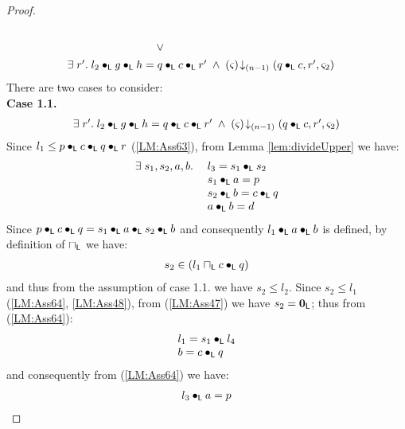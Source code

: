 \begin{lemma}[]
\begin{proof}
\begin{align}
\begin{array}{l l}
	\end{array}\label{LM:Ass62}\\
	& \hspace*{3cm}\lor\; \nonumber\\
	&\begin{array}{l l}
		\exsts{r'} l_2 \composeL g \composeL h = q \composeL c \composeL r' \;\land\; \extendsAMUpto{\amod{}}{(n-1)}{q\composeL c}{r'}{\amod{2}}
	\end{array}  \label{LM:Ass63}
\end{align}
%
There are two cases to consider:\\
\textbf{Case 1.1.} 
\[
\begin{array}{l}
		\exists\; r'.\; l_2 \bullet_{\textsf{L}} g \bullet_{\textsf{L}} h = q \bullet_{\textsf{L}} c \bullet_{\textsf{L}} r' \;\land\; \left(\varsigma_{}\right) \!\downarrow_{(n-1)} \left(q\bullet_{\textsf{L}} c, r', \varsigma_{2}\right)
\end{array}
\]
%
Since $l_1 \leq p \bullet_{\textsf{L}} c \bullet_{\textsf{L}} q \bullet_{\textsf{L}} r$ (\ref{LM:Ass63}), from Lemma \ref{lem:divideUpper} we have:
%
\begin{align}
	\begin{array}{l l}
	\exists\; s_1, s_2, a, b.\;& l_3 = s_1 \bullet_{\textsf{L}} s_2 \\
	& s_1 \bullet_{\textsf{L}} a =  p\\
	& s_2 \bullet_{\textsf{L}} b = c \bullet_{\textsf{L}} q\\
	&a \bullet_{\textsf{L}}  b = d 
	\end{array} \label{LM:Ass64}
\end{align}
%
Since $p \bullet_{\textsf{L}} c \bullet_{\textsf{L}} q  = s_1 \bullet_{\textsf{L}} a \bullet_{\textsf{L}} s_2 \bullet_{\textsf{L}} b $ and consequently $l_1 \bullet_{\textsf{L}} a \bullet_{\textsf{L}} b$ is defined, by definition of $\sqcap_{\textsf{L}}$ we have:
%
\begin{align}
	s_2 \in (l_1 \sqcap_{\textsf{L}} c \bullet_{\textsf{L}} q) \nonumber
\end{align} 
%
and thus from the assumption of case 1.1. we have $s_2 \leq l_2$. Since $s_2 \leq l_1$ (\ref{LM:Ass64}, \ref{LM:Ass48}), from (\ref{LM:Ass47}) we have $s_2 = \mathbf{0}_{\textsf{L}}$; thus from (\ref{LM:Ass64}):
%
\begin{align}
	\begin{array}{l}
	l_1 = s_1 \bullet_{\textsf{L}} l_4\\
	b = c \bullet_{\textsf{L}} q
	\end{array} \label{LM:Ass644}
\end{align} 
% 
and consequently from (\ref{LM:Ass64}) we have:
%
\begin{align}
	l_3 \composeL a = p \nonumber\\

\end{align}
\end{proof}
\end{lemma}
